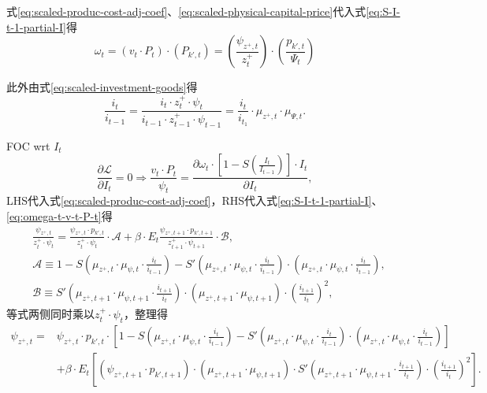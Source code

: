 式\eqref{eq:scaled-produc-cost-adj-coef}、\eqref{eq:scaled-physical-capital-price}代入式\eqref{eq:S-I-t-1-partial-I}得
\begin{equation}
\label{eq:omega-t-v-t-P-t}
\omega_t = \left(v_t \cdot P_t \right) \cdot \left(P_{k',t}\right) = \left(\frac{\psi_{z^+,t}}{z^+_t}\right) \cdot \left(\frac{p_{k',t}}{\Psi_t}\right)
\end{equation}

此外由式\eqref{eq:scaled-investment-goods}得
\begin{equation}
\label{eq:I-t-1-i-t-i}
\frac{i_t}{i_{t-1}} = \frac{
  i_t \cdot z^+_t \cdot \psi_t
}{
  i_{t-1} \cdot z^+_{t-1} \cdot \psi_{t-1}
}
=\frac{i_t}{i_{t_1}} \cdot \mu_{z^+,t} \cdot \mu_{\Psi,t}.
\end{equation}

FOC wrt $I_t$
\begin{equation}
\label{eq:eq:HH-max-FOC-I-intm}
\frac{\partial \mathcal{L}}{\partial I_t} = 0 \Rightarrow \frac{v_t \cdot P_t}{\psi_t} =\frac{\partial \omega_t \cdot \left[1-S \left(\frac{I_t}{I_{t-1}}\right)\right] \cdot I_t}{\partial I_t},
\end{equation}
LHS代入式\eqref{eq:scaled-produc-cost-adj-coef}，RHS代入式\eqref{eq:S-I-t-1-partial-I}、\eqref{eq:omega-t-v-t-P-t}得
\begin{equation}
\begin{split}
&\frac{\psi_{z^+,t}}{z^+_t \cdot \psi_t} = \frac{\psi_{z^+,t} \cdot p_{k',t}}{z^+_t \cdot \psi_t} \cdot \mathcal{A} + \beta \cdot E_t \frac{\psi_{z^+,t+1} \cdot p_{k',t+1}}{z^+_{t+1} \cdot \psi_{t+1}} \cdot \mathcal{B},\\
& \mathcal{A} \equiv 1-S\left(
\mu_{z^+,{t}} \cdot \mu_{\psi,t} \cdot \frac{i_{t}}{i_{t-1}}
\right)
-S'\left(
\mu_{z^+,{t}} \cdot \mu_{\psi,t} \cdot \frac{i_{t}}{i_{t-1}}
\right) \cdot
\left(
\mu_{z^+,{t}} \cdot \mu_{\psi,t} \cdot \frac{i_{t}}{i_{t-1}}
\right), \\
& \mathcal{B} \equiv S'\left(
\mu_{z^+,{t+1}} \cdot \mu_{\psi,t+1} \cdot \frac{i_{t+1}}{i_{t}}
\right) \cdot
\left(
\mu_{z^+,{t+1}} \cdot \mu_{\psi,t+1} \right)
\cdot \left(
  \frac{i_{t+1}}{i_{t}}
\right)^2,
\end{split}
\end{equation}
等式两侧同时乘以$z^+_t \cdot \psi_t$，整理得
\begin{equation}
\label{eq:HH-max-FOC-I}
\begin{split}
\psi_{z^+,t} = &\psi_{z^+,t} \cdot p_{k',t} \cdot \left[
1-S\left(
\mu_{z^+,{t}} \cdot \mu_{\psi,t} \cdot \frac{i_{t}}{i_{t-1}}
\right)
-S'\left(
\mu_{z^+,{t}} \cdot \mu_{\psi,t} \cdot \frac{i_{t}}{i_{t-1}}
\right) \cdot
\left(
\mu_{z^+,{t}} \cdot \mu_{\psi,t} \cdot \frac{i_{t}}{i_{t-1}}
\right)
\right] \\
&+ \beta \cdot E_t \left[
\left(\psi_{z^+,t+1} \cdot p_{k',t+1} \right) \cdot
\left(
\mu_{z^+,{t+1}} \cdot \mu_{\psi,t+1} \right)
\cdot
S'\left(
\mu_{z^+,{t+1}} \cdot \mu_{\psi,t+1} \cdot \frac{i_{t+1}}{i_{t}}
\right) \cdot
\left(
  \frac{i_{t+1}}{i_{t}}
\right)^2
\right].
\end{split}
\end{equation}

